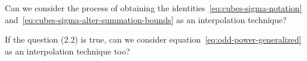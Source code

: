 \begin{question}
    Can we consider the process of obtaining the identities~\eqref{eq:cubes-sigma-notation} and~\eqref{eq:cubes-sigma-alter-summation-bounds}
    as an interpolation technique?
\end{question}

\begin{question}
    If the question (2.2) is true, can we consider equation~\eqref{eq:odd-power-generalized} as an interpolation technique too?
\end{question}
